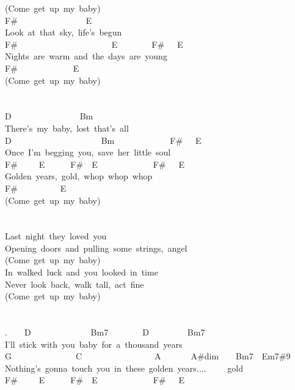 {(Come\ get\ up\ my\ baby)\\
F\#\ \ \ \ \ \ \ \ \ \ \ \ \ \ \ \ E\\
Look\ at\ that\ sky,\ life's\ begun\\
F\#\ \ \ \ \ \ \ \ \ \ \ \ \ \ \ \ \ \ \ \ \ \ E\ \ \ \ \ \ \ \ F\#\ \ \ E\\
Nights\ are\ warm\ and\ the\ days\ are\ young\\
F\#\ \ \ \ \ \ \ \ \ \ \ \ \ E\\
(Come\ get\ up\ my\ baby)\\
\\
\\
D\ \ \ \ \ \ \ \ \ \ \ \ \ \ \ \ Bm\\
There's\ my\ baby,\ lost\ that's\ all\\
D\ \ \ \ \ \ \ \ \ \ \ \ \ \ \ \ \ \ \ \ \ Bm\ \ \ \ \ \ \ \ \ \ \ \ \ F\#\ \ \ E\\
Once\ I'm\ begging\ you,\ save\ her\ little\ soul\\
F\#\ \ \ \ \ E\ \ \ \ \ \ F\#\ \ E\ \ \ \ \ \ \ \ \ \ \ \ \ F\#\ \ \ E\\
Golden\ years,\ gold,\ whop\ whop\ whop\\
F\#\ \ \ \ \ \ \ \ \ \ E\\
(Come\ get\ up\ my\ baby)\\
\\
\\
Last\ night\ they\ loved\ you\ \\
Opening\ doors\ and\ pulling\ some\ strings,\ angel\\
(Come\ get\ up\ my\ baby)\\
In\ walked\ luck\ and\ you\ looked\ in\ time\\
Never\ look\ back,\ walk\ tall,\ act\ fine\\
(Come\ get\ up\ my\ baby)\\
\\
\\
.\ \ \ \ D\ \ \ \ \ \ \ \ \ \ \ \ \ \ Bm7\ \ \ \ \ \ \ \ D\ \ \ \ \ \ \ \ \ Bm7\\
I'll\ stick\ with\ you\ baby\ for\ a\ thousand\ years\\
G\ \ \ \ \ \ \ \ \ \ \ \ \ \ \ C\ \ \ \ \ \ \ \ \ \ \ \ \ \ \ \ \ A\ \ \ \ \ \ \ A\#dim\ \ \ \ Bm7\ \ Em7\#9\\
Nothing's\ gonna\ touch\ you\ in\ these\ golden\ years....\ \ \ \ \ gold\\
F\#\ \ \ \ \ E\ \ \ \ \ \ F\#\ \ E\ \ \ \ \ \ \ \ \ \ \ \ \ F\#\ \ \ E\\
}
